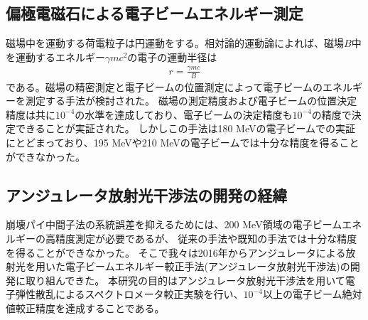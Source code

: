 \documentclass[a4paper,11pt,uplatex]{jsbook}
\begin{document}
\subsection{偏極電磁石による電子ビームエネルギー測定}
磁場中を運動する荷電粒子は円運動をする。相対論的運動論によれば、磁場$B$中を運動するエネルギー$\gamma mc^2$の電子の運動半径は
\begin{eqnarray}
  r = \frac{\gamma mc}{B}
\end{eqnarray}
である。磁場の精密測定と電子ビームの位置測定によって電子ビームのエネルギーを測定する手法が検討された。
磁場の測定精度および電子ビームの位置決定精度は共に$10^{-4}$の水準を達成しており、電子ビームの決定精度も$10^{-4}$の精度で決定できることが実証された。
しかしこの手法は180 MeVの電子ビームでの実証にとどまっており、195 MeVや210 MeVの電子ビームでは十分な精度を得ることができなかった\cite{herrmann}。
\subsection{アンジュレータ放射光干渉法の開発の経緯}
崩壊パイ中間子法の系統誤差を抑えるためには、200 MeV領域の電子ビームエネルギーの高精度測定が必要であるが、
従来の手法や既知の手法では十分な精度を得ることができなかった。
そこで我々は2016年からアンジュレータによる放射光を用いた電子ビームエネルギー較正手法(アンジュレータ放射光干渉法)の開発に取り組んできた\cite{klag2018,klag2023}。
本研究の目的はアンジュレータ放射光干渉法を用いて電子弾性散乱によるスペクトロメータ較正実験を行い、$10^{-4}$以上の電子ビーム絶対値較正精度を達成することである。
\end{document}
